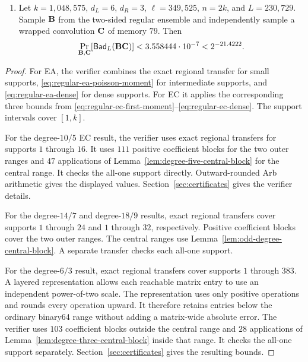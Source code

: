 \begin{theorem}
\begin{enumerate}
  $\C$ of memory $4$.  Then
  \begin{equation}
   \Pr_{\B,\C}[\Bad_L(\B\C)]
   <2.987318\cdot10^{-7}<2^{-21.6746}.
   \label{eq:biregular-binary-ec-degree-eighteen-certificate}
  \end{equation}
  \item Let $k=1{,}048{,}575$, $d_L=6$, $d_R=3$,
  $\ell=349{,}525$, $n=2k$, and $L=230{,}729$.  Sample $\mathbf B$ from the
  two-sided regular ensemble and independently sample a wrapped convolution
  $\C$ of memory $79$.  Then
  \begin{equation}
   \Pr_{\mathbf B,\mathbf C}[\mathsf{Bad}_L(\mathbf B\mathbf C)]
   <3.558444\cdot10^{-7}<2^{-21.4222}.
   \label{eq:biregular-binary-ec-degree-six-certificate}
  \end{equation}
\end{enumerate}
\end{theorem}

\begin{proof}
For EA, the verifier combines the exact regional transfer for small supports,
\eqref{eq:regular-ea-poisson-moment} for intermediate supports, and
\eqref{eq:regular-ea-dense} for dense supports.  For EC it applies the
corresponding three bounds from
\eqref{eq:regular-ec-first-moment}--\eqref{eq:regular-ec-dense}.  The support
intervals cover $[1,k]$.

For the degree-$10/5$ EC result, the verifier uses exact regional transfers for
supports $1$ through $16$.  It uses $111$ positive coefficient blocks for
the two outer ranges and $47$ applications of
Lemma~\ref{lem:degree-five-central-block} for the central range.  It checks
the all-one support directly.  Outward-rounded Arb arithmetic gives the
displayed values.  Section~\ref{sec:certificates} gives the verifier details.

For the degree-$14/7$ and degree-$18/9$ results, exact regional transfers
cover supports $1$ through $24$ and $1$ through $32$, respectively.  Positive
coefficient blocks cover the two outer ranges.  The central ranges use
Lemma~\ref{lem:odd-degree-central-block}.  A separate transfer checks each
all-one support.

For the degree-$6/3$ result, exact regional transfers cover supports $1$
through $383$.  A layered representation allows each reachable matrix entry
to use an independent power-of-two scale.  The representation uses only positive
operations and rounds every operation upward.  It therefore retains entries
below the ordinary binary64 range without adding a matrix-wide absolute
error.  The verifier uses $103$ coefficient blocks outside the central range
and $28$ applications of Lemma~\ref{lem:degree-three-central-block} inside
that range.  It checks the all-one support separately.
Section~\ref{sec:certificates} gives the resulting bounds.
\end{proof}

